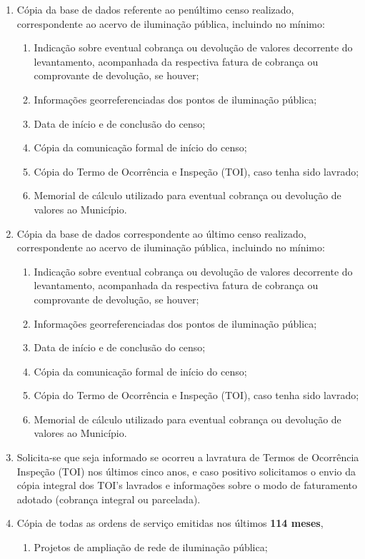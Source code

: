\begin{enumerate}[resume]
\item Cópia da base de dados referente ao penúltimo censo realizado, correspondente ao acervo de iluminação pública, incluindo no mínimo:
\begin{enumerate}
  \item Indicação sobre eventual cobrança ou devolução de valores decorrente do levantamento, acompanhada da respectiva fatura de cobrança ou comprovante de devolução, se houver;
  \item Informações georreferenciadas dos pontos de iluminação pública;
  \item Data de início e de conclusão do censo; 
  \item Cópia da comunicação formal de início do censo;
  \item Cópia do Termo de Ocorrência e Inspeção (TOI), caso tenha sido lavrado;
  \item Memorial de cálculo utilizado para eventual cobrança ou devolução de valores ao Município. 
\end{enumerate}
\item Cópia da base de dados correspondente ao último censo realizado, correspondente ao acervo de iluminação pública, incluindo no mínimo: 
\begin{enumerate}
  \item Indicação sobre eventual cobrança ou devolução de valores decorrente do levantamento, acompanhada da respectiva fatura de cobrança ou comprovante de devolução, se houver; 
  \item Informações georreferenciadas dos pontos de iluminação pública;
  \item Data de início e de conclusão do censo;
  \item Cópia da comunicação formal de início do censo; 
  \item Cópia do Termo de Ocorrência e Inspeção (TOI), caso tenha sido lavrado;
  \item Memorial de cálculo utilizado para eventual cobrança ou devolução de valores ao Município. 
\end{enumerate}
\item Solicita-se que seja informado se ocorreu a lavratura de Termos de Ocorrência Inspeção (TOI) nos últimos cinco anos, e caso positivo solicitamos o envio da cópia integral dos TOI’s lavrados e informações sobre o modo de faturamento adotado (cobrança integral ou parcelada).
\item Cópia de todas as ordens de serviço emitidas nos últimos \textbf{114 meses},
\begin{enumerate}
  \item Projetos de ampliação de rede de iluminação pública;
\end{enumerate}
\end{enumerate}